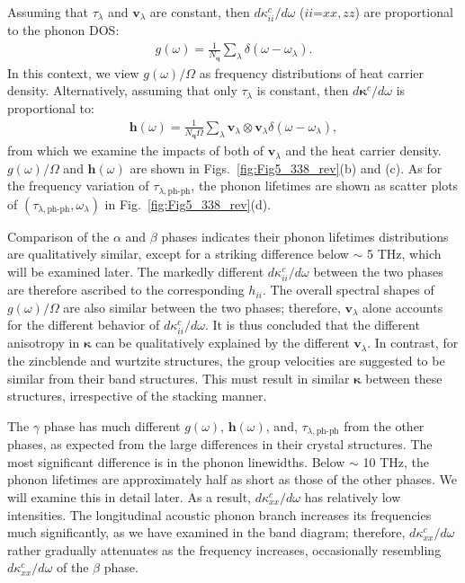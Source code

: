\documentclass[twocolumn,amsmath,amssymb,a4paper,prb,superscriptaddress,floatfix]{revtex4-1}
\begin{document}
Assuming that $\tau_\lambda$ and $\mathbf{v}_\lambda$ are constant, then
$d\kappa_{ii}^c/d\omega$ ($ii$=$xx,zz$) are proportional to the phonon
DOS: 
\begin{align}
 \label{eq:dos}
 g(\omega) = \frac{1}{N_\mathbf{q}}
 \sum_\lambda
 \delta(\omega-\omega_{\lambda}).
\end{align}
In this context, we view $g(\omega)/\Omega$ as frequency distributions of heat
carrier density. Alternatively, assuming that only $\tau_\lambda$ is constant,
then $d\boldsymbol{\kappa}^c/d\omega$ is proportional to:
\begin{align}
 \label{eq:wdos}
 \boldsymbol{h}(\omega) = \frac{1}{N_\mathbf{q}\Omega}
 \sum_\lambda
 \mathbf{v}_\lambda \otimes \mathbf{v}_\lambda
 \delta(\omega-\omega_{\lambda}),
\end{align}
from which we examine the impacts of both of $\mathbf{v}_\lambda$ and the heat carrier
density. $g(\omega)/\Omega$ and  $\boldsymbol{h}(\omega)$
are shown in
Figs.~\ref{fig:Fig5_338_rev}(b) and (c). As for the frequency
variation of $\tau_{\lambda,\text{ph-ph}}$, the phonon lifetimes are shown as scatter
plots of $(\tau_{\lambda,\text{ph-ph}},\omega_\lambda)$ in Fig.~\ref{fig:Fig5_338_rev}(d).

Comparison of the $\alpha$ and $\beta$ phases indicates their phonon lifetimes
distributions are qualitatively similar, except for a striking difference below
$\sim$ 5 THz, which will be examined later. The markedly different
$d\kappa_{ii}^c/d\omega$ between the two phases are therefore ascribed to the
corresponding $h_{ii}$. The overall spectral shapes of $g(\omega)/\Omega$ are also
similar between the two phases; therefore, $\mathbf{v}_\lambda$ alone accounts
for the different behavior of $d\kappa_{ii}^c/d\omega$. It is thus concluded
that the different anisotropy in $\boldsymbol{\kappa}$ can be qualitatively
explained by the different $\mathbf{v}_\lambda$.
In contrast, for the zincblende and wurtzite
structures, the group velocities are suggested to be similar from their band
structures\cite{phono3py}.
This must result in similar $\boldsymbol{\kappa}$ between these
structures, irrespective of the stacking manner. 

The $\gamma$ phase has much different $g(\omega)$, $\boldsymbol{h}(\omega)$,
and, $\tau_{\lambda,\text{ph-ph}}$ from the other phases, as expected from the large
differences in their crystal structures. The most significant difference is in
the phonon linewidths. Below $\sim$ 10 THz, the phonon lifetimes are approximately
half as short as those of the other phases. We will examine this in detail
later. As a result, $d\kappa_{xx}^c/d\omega$ has relatively low intensities. The
longitudinal acoustic phonon branch increases its frequencies much
significantly, as we have examined in the band diagram; therefore,
$d\kappa_{xx}^c/d\omega$ rather gradually attenuates as the frequency increases,
occasionally resembling $d\kappa_{xx}^c/d\omega$ of the $\beta$ phase.
\end{document}
